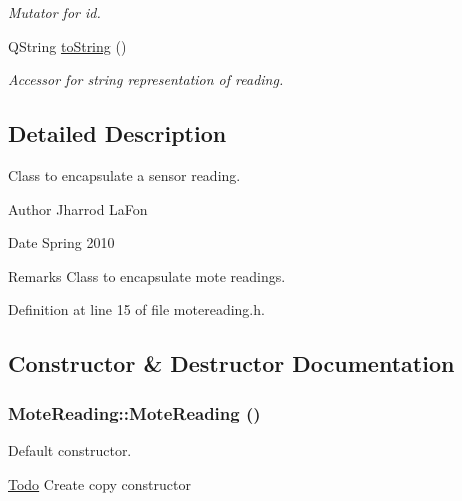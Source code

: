 \begin{DoxyCompactItemize}
\begin{DoxyCompactList}\small\item\em Mutator for id. \item\end{DoxyCompactList}\item 
QString \hyperlink{classMoteReading_a5e60715c001c14f3e3f4cff6f886f0ad}{toString} ()
\begin{DoxyCompactList}\small\item\em Accessor for string representation of reading. \item\end{DoxyCompactList}\end{DoxyCompactItemize}


\subsection{Detailed Description}
Class to encapsulate a sensor reading. \begin{DoxyAuthor}{Author}
Jharrod LaFon 
\end{DoxyAuthor}
\begin{DoxyDate}{Date}
Spring 2010 
\end{DoxyDate}
\begin{DoxyRemark}{Remarks}
Class to encapsulate mote readings. 
\end{DoxyRemark}


Definition at line 15 of file motereading.h.



\subsection{Constructor \& Destructor Documentation}
\hypertarget{classMoteReading_ad2555254ab4fd4ce31ebafeea362d255}{
\subsubsection[{MoteReading}]{\setlength{\rightskip}{0pt plus 5cm}MoteReading::MoteReading ()}}
\label{classMoteReading_ad2555254ab4fd4ce31ebafeea362d255}


Default constructor. 

\begin{Desc}
\item[\hyperlink{todo__todo000003}{Todo}]Create copy constructor \end{Desc}


